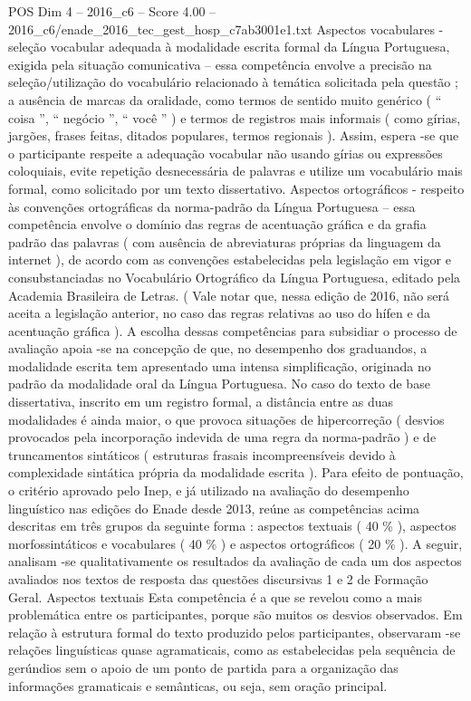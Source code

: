 \begin{textsample}{POS Dim 4 – 2016\_c6 – Score 4.00 – 2016\_c6/enade\_2016\_tec\_gest\_hosp\_c7ab3001e1.txt}
Aspectos vocabulares - seleção vocabular adequada à modalidade escrita formal da Língua Portuguesa, exigida pela situação comunicativa – essa competência envolve a precisão na seleção/utilização do vocabulário relacionado à temática solicitada pela questão ; a ausência de marcas da oralidade, como termos de sentido muito genérico ( “ coisa ”, “ negócio ”, “ você ” ) e termos de registros mais informais ( como gírias, jargões, frases feitas, ditados populares, termos regionais ).
Assim, espera -se que o participante respeite a adequação vocabular não usando gírias ou expressões coloquiais, evite repetição desnecessária de palavras e utilize um vocabulário mais formal, como solicitado por um texto dissertativo.
Aspectos ortográficos - respeito às convenções ortográficas da norma-padrão da Língua Portuguesa – essa competência envolve o domínio das regras de acentuação gráfica e da grafia padrão das palavras ( com ausência de abreviaturas próprias da linguagem da internet ), de acordo com as convenções estabelecidas pela legislação em vigor e consubstanciadas no Vocabulário Ortográfico da Língua Portuguesa, editado pela Academia Brasileira de Letras. ( Vale notar que, nessa edição de 2016, não será aceita a legislação anterior, no caso das regras relativas ao uso do hífen e da acentuação gráfica ).
A escolha dessas competências para subsidiar o processo de avaliação apoia -se na concepção de que, no desempenho dos graduandos, a modalidade escrita tem apresentado uma intensa simplificação, originada no padrão da modalidade oral da Língua Portuguesa.
No caso do texto de base dissertativa, inscrito em um registro formal, a distância entre as duas modalidades é ainda maior, o que provoca situações de hipercorreção ( desvios provocados pela incorporação indevida de uma regra da norma-padrão ) e de truncamentos sintáticos ( estruturas frasais incompreensíveis devido à complexidade sintática própria da modalidade escrita ).
Para efeito de pontuação, o critério aprovado pelo Inep, e já utilizado na avaliação do desempenho linguístico nas edições do Enade desde 2013, reúne as competências acima descritas em três grupos da seguinte forma : aspectos textuais ( 40 \% ), aspectos morfossintáticos e vocabulares ( 40 \% ) e aspectos ortográficos ( 20 \% ).
A seguir, analisam -se qualitativamente os resultados da avaliação de cada um dos aspectos avaliados nos textos de resposta das questões discursivas 1 e 2 de Formação Geral.
Aspectos textuais Esta competência é a que se revelou como a mais problemática entre os participantes, porque são muitos os desvios observados.
Em relação à estrutura formal do texto produzido pelos participantes, observaram -se relações linguísticas quase agramaticais, como as estabelecidas pela sequência de gerúndios sem o apoio de um ponto de partida para a organização das informações gramaticais e semânticas, ou seja, sem oração principal.

\end{textsample}
